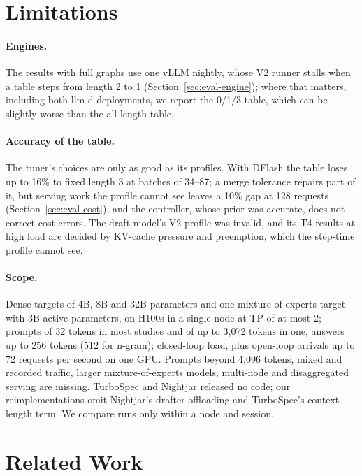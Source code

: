 \documentclass{article}
\begin{document}
\section{Limitations}
\label{sec:limits}

\paragraph{Engines.} The results with full graphs use one vLLM nightly, whose V2 runner stalls when a table steps from length 2 to 1 (Section~\ref{sec:eval-engine}); where that matters, including both llm-d deployments, we report the 0/1/3 table, which can be slightly worse than the all-length table.

\paragraph{Accuracy of the table.} The tuner's choices are only as good as its profiles. With DFlash the table loses up to 16\% to fixed length 3 at batches of 34--87; a merge tolerance repairs part of it, but serving work the profile cannot see leaves a 10\% gap at 128 requests (Section~\ref{sec:eval-cost}), and the controller, whose prior was accurate, does not correct cost errors. The draft model's V2 profile was invalid, and its T4 results at high load are decided by KV-cache pressure and preemption, which the step-time profile cannot see.

\paragraph{Scope.} Dense targets of 4B, 8B and 32B parameters and one mixture-of-experts target with 3B active parameters, on H100s in a single node at TP of at most 2; prompts of 32 tokens in most studies and of up to 3{,}072 tokens in one, answers up to 256 tokens (512 for n-gram); closed-loop load, plus open-loop arrivals up to 72 requests per second on one GPU. Prompts beyond 4{,}096 tokens, mixed and recorded traffic, larger mixture-of-experts models, multi-node and disaggregated serving are missing. TurboSpec and Nightjar released no code; our reimplementations omit Nightjar's drafter offloading and TurboSpec's context-length term. We compare runs only within a node and session.

\section{Related Work}
\label{sec:related}
\end{document}
